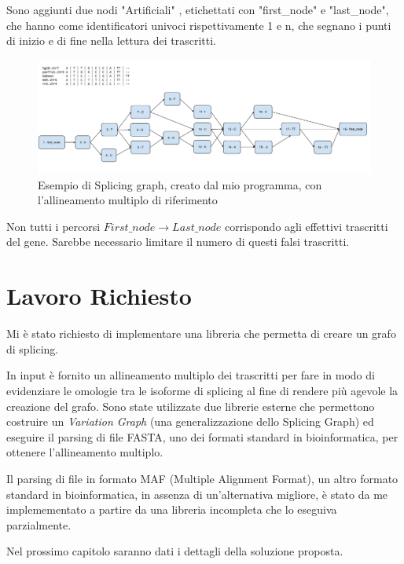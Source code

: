 Sono aggiunti due nodi "Artificiali" , etichettati con "first\_node" e "last\_node", che hanno come identificatori univoci rispettivamente 1 e n, che segnano i punti di inizio e di fine nella lettura dei trascritti.

\begin{figure}
    \centering
    \includegraphics[scale=0.55]{images/Spling graph example.PNG}
    \caption{Esempio di Splicing graph, creato dal mio programma, con l'allineamento multiplo di riferimento}
    \label{fig:slicing_graph_example}
\end{figure}

Non tutti i percorsi $First\_node \to Last\_node$ corrispondo agli effettivi trascritti del gene. Sarebbe necessario limitare il numero di questi falsi trascritti.

\section{Lavoro Richiesto}
Mi è stato richiesto di implementare una libreria che permetta di creare un grafo di splicing.

In input è fornito un allineamento multiplo dei trascritti per fare in modo di evidenziare le omologie tra le isoforme di splicing al fine di rendere più agevole la creazione del grafo. Sono state utilizzate due librerie esterne che permettono costruire un \textit{Variation Graph} (una generalizzazione dello Splicing Graph) ed eseguire il parsing di file FASTA, uno dei formati standard in bioinformatica, per ottenere l'allineamento multiplo. 

Il parsing di file in formato MAF (Multiple Alignment Format), un altro formato standard in bioinformatica, in assenza di un'alternativa migliore, è stato da me implemementato a partire da una libreria incompleta che lo eseguiva parzialmente.

Nel prossimo capitolo saranno dati i dettagli della soluzione proposta.